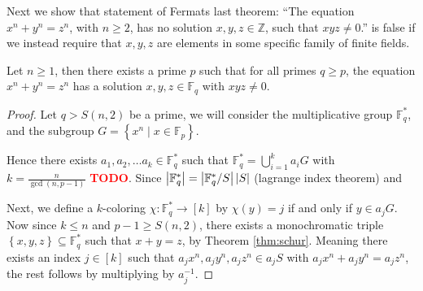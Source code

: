 Next we show that statement of Fermats last theorem: ``The equation $x^n + y^n = z^n$, with $n \geq 2$, has no solution $x, y, z \in \mathbb{Z}$, such that $xyz \neq 0$.'' is false if we instead require that $x, y, z$ are elements in some specific family of finite fields.

\begin{theorem}
	Let $n \geq 1$, then there exists a prime $p$ such that for all primes $q \geq p$, the equation $x^n + y^n = z^{n}$ has a solution $x, y, z \in \mathbb{F}_{q}$ with $xyz \neq 0$.
\end{theorem}
\begin{proof}
	Let $q > S(n, 2)$ be a prime, we will consider the multiplicative group $\mathbb{F}_q^{*}$, and the subgroup $G = \left\{x^n \mid x \in \mathbb{F}_p\right\}$.

	Hence there exists $a_1, a_2, \ldots a_k \in \mathbb{F}_q^{*}$ such that $\mathbb{F}_q^{*} = \bigcup_{i = 1}^k a_i G$ with $k = \frac{n}{\gcd(n, p - 1)}$ \textcolor{red}{\textbf{TODO}}. Since $\left\lvert\mathbb{F}_q^{*}\right\rvert = \left\lvert\mathbb{F}_q^{*} / S\right\rvert\left\lvert S\right\rvert$ (lagrange index theorem) and

	Next, we define a $k$-coloring $\chi: \mathbb{F}_q^* \to [k]$ by $\chi(y) = j$ if and only if $y \in a_j G$. Now since $k \leq n$ and $p - 1 \geq S(n, 2)$, there exists a monochromatic triple $\left\{x, y, z\right\} \subseteq \mathbb{F}_q^{*}$ such that $x + y = z$, by Theorem \ref{thm:schur}. Meaning there exists an index $j \in [k]$ such that $a_{j}x^{n}, a_jy^{n}, a_{j}z^{n} \in a_jS$ with $a_{j}x^{n} + a_{j}y^{n} = a_jz^{n}$, the rest follows by multiplying by $a_{j}^{-1}$.
\end{proof}
